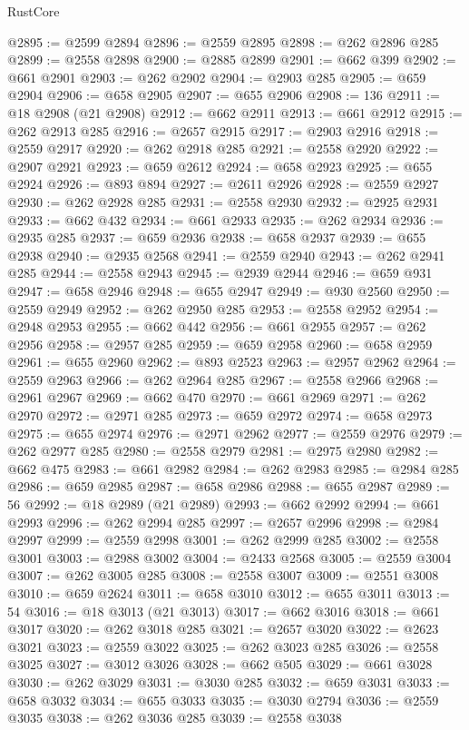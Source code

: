 \begin{lexlean}{RustCore}
\begin{coremodule}
@2895 := @2599 @2894
@2896 := @2559 @2895
@2898 := @262 @2896 @285
@2899 := @2558 @2898
@2900 := @2885 @2899
@2901 := @662 @399
@2902 := @661 @2901
@2903 := @262 @2902
@2904 := @2903 @285
@2905 := @659 @2904
@2906 := @658 @2905
@2907 := @655 @2906
@2908 := 136
@2911 := @18 @2908 (@21 @2908)
@2912 := @662 @2911
@2913 := @661 @2912
@2915 := @262 @2913 @285
@2916 := @2657 @2915
@2917 := @2903 @2916
@2918 := @2559 @2917
@2920 := @262 @2918 @285
@2921 := @2558 @2920
@2922 := @2907 @2921
@2923 := @659 @2612
@2924 := @658 @2923
@2925 := @655 @2924
@2926 := @893 @894
@2927 := @2611 @2926
@2928 := @2559 @2927
@2930 := @262 @2928 @285
@2931 := @2558 @2930
@2932 := @2925 @2931
@2933 := @662 @432
@2934 := @661 @2933
@2935 := @262 @2934
@2936 := @2935 @285
@2937 := @659 @2936
@2938 := @658 @2937
@2939 := @655 @2938
@2940 := @2935 @2568
@2941 := @2559 @2940
@2943 := @262 @2941 @285
@2944 := @2558 @2943
@2945 := @2939 @2944
@2946 := @659 @931
@2947 := @658 @2946
@2948 := @655 @2947
@2949 := @930 @2560
@2950 := @2559 @2949
@2952 := @262 @2950 @285
@2953 := @2558 @2952
@2954 := @2948 @2953
@2955 := @662 @442
@2956 := @661 @2955
@2957 := @262 @2956
@2958 := @2957 @285
@2959 := @659 @2958
@2960 := @658 @2959
@2961 := @655 @2960
@2962 := @893 @2523
@2963 := @2957 @2962
@2964 := @2559 @2963
@2966 := @262 @2964 @285
@2967 := @2558 @2966
@2968 := @2961 @2967
@2969 := @662 @470
@2970 := @661 @2969
@2971 := @262 @2970
@2972 := @2971 @285
@2973 := @659 @2972
@2974 := @658 @2973
@2975 := @655 @2974
@2976 := @2971 @2962
@2977 := @2559 @2976
@2979 := @262 @2977 @285
@2980 := @2558 @2979
@2981 := @2975 @2980
@2982 := @662 @475
@2983 := @661 @2982
@2984 := @262 @2983
@2985 := @2984 @285
@2986 := @659 @2985
@2987 := @658 @2986
@2988 := @655 @2987
@2989 := 56
@2992 := @18 @2989 (@21 @2989)
@2993 := @662 @2992
@2994 := @661 @2993
@2996 := @262 @2994 @285
@2997 := @2657 @2996
@2998 := @2984 @2997
@2999 := @2559 @2998
@3001 := @262 @2999 @285
@3002 := @2558 @3001
@3003 := @2988 @3002
@3004 := @2433 @2568
@3005 := @2559 @3004
@3007 := @262 @3005 @285
@3008 := @2558 @3007
@3009 := @2551 @3008
@3010 := @659 @2624
@3011 := @658 @3010
@3012 := @655 @3011
@3013 := 54
@3016 := @18 @3013 (@21 @3013)
@3017 := @662 @3016
@3018 := @661 @3017
@3020 := @262 @3018 @285
@3021 := @2657 @3020
@3022 := @2623 @3021
@3023 := @2559 @3022
@3025 := @262 @3023 @285
@3026 := @2558 @3025
@3027 := @3012 @3026
@3028 := @662 @505
@3029 := @661 @3028
@3030 := @262 @3029
@3031 := @3030 @285
@3032 := @659 @3031
@3033 := @658 @3032
@3034 := @655 @3033
@3035 := @3030 @2794
@3036 := @2559 @3035
@3038 := @262 @3036 @285
@3039 := @2558 @3038

\end{coremodule}
\end{lexlean}
